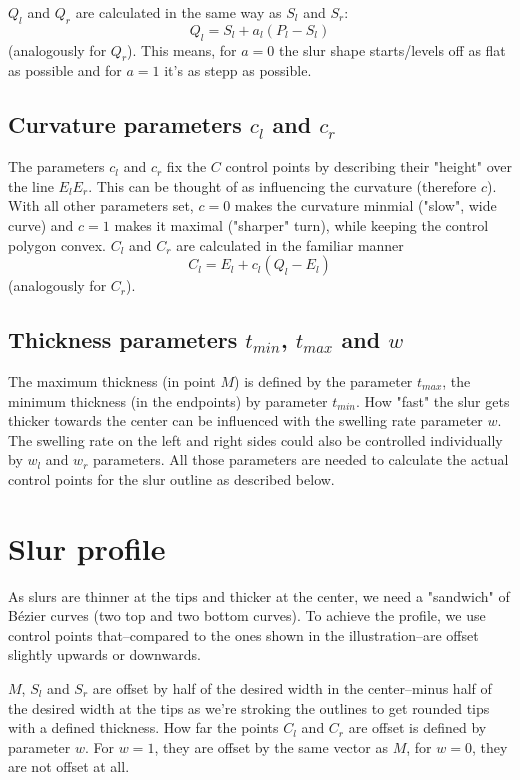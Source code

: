 \documentclass{article}
\begin{document}
$Q_l$ and $Q_r$ are calculated in the same way as $S_l$ and $S_r$:
$$Q_l=S_l+a_l(P_l-S_l)$$
(analogously for $Q_r$).
This means, for $a=0$ the slur shape starts/levels off as flat as possible and for $a=1$ it's as stepp as possible.

\subsection{Curvature parameters $c_l$ and $c_r$}
The parameters $c_l$ and $c_r$ fix the $C$ control points by describing their "height" over the line $E_l E_r$.
This can be thought of as influencing the curvature (therefore $c$).
With all other parameters set, $c=0$ makes the curvature minmial ("slow", wide curve)
and $c=1$ makes it maximal ("sharper" turn), while keeping the control polygon convex.
$C_l$ and $C_r$ are calculated in the familiar manner
$$C_l=E_l+c_l(Q_l-E_l)$$
(analogously for $C_r$).

\subsection{Thickness parameters $t_{min}$, $t_{max}$ and $w$}
The maximum thickness (in point $M$) is defined by the parameter $t_{max}$, the minimum thickness (in the endpoints) by parameter $t_{min}$.
How "fast" the slur gets thicker towards the center can be influenced with the swelling rate parameter $w$.
The swelling rate on the left and right sides could also be controlled individually by $w_l$ and $w_r$ parameters.
All those parameters are needed to calculate the actual control points for the slur outline as described below.

\section{Slur profile}
As slurs are thinner at the tips and thicker at the center, we need a "sandwich" of Bézier curves (two top and two bottom curves).
To achieve the profile, we use control points that--compared to the ones shown in the illustration--are offset slightly upwards or downwards.

$M$, $S_l$ and $S_r$ are offset by half of the desired width in the center--minus half of the desired width at the tips
as we're stroking the outlines to get rounded tips with a defined thickness.
How far the points $C_l$ and $C_r$ are offset is defined by parameter $w$.
For $w=1$, they are offset by the same vector as $M$, for $w=0$, they are not offset at all.
\end{document}
